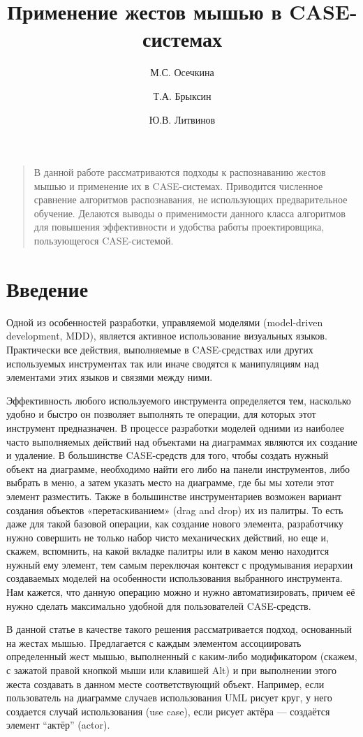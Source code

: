 \documentclass[a5paper]{article}
\title{Применение жестов мышью в CASE-системах}
\author{М.С. Осечкина \and Т.А. Брыксин \and Ю.В. Литвинов}
\date{}
\begin{document}
\maketitle
\thispagestyle{empty}

\begin{quote}
\small\noindent
В данной работе рассматриваются подходы к распознаванию жестов мышью и применение их в CASE-системах. Приводится численное сравнение алгоритмов распознавания, не использующих предварительное обучение. Делаются выводы о применимости данного класса алгоритмов для повышения эффективности и удобства работы проектировщика, пользующегося CASE-системой.
\end{quote}

\section*{Введение}
Одной из особенностей разработки, управляемой моделями (model-driven development, MDD), является активное использование визуальных языков. Практически все действия, выполняемые в CASE-средствах или других используемых инструментах так или иначе сводятся к манипуляциям над элементами этих языков и связями между ними. 

Эффективность любого используемого инструмента определяется тем, насколько удобно и быстро он позволяет выполнять те операции, для которых этот инструмент предназначен. В процессе разработки моделей одними из наиболее часто выполняемых действий над объектами на диаграммах являются их создание и удаление.  В большинстве CASE-средств для того, чтобы создать нужный объект на диаграмме, необходимо найти его либо на панели инструментов, либо выбрать в меню, а затем указать место на диаграмме, где бы мы хотели этот элемент разместить. Также в большинстве инструментариев возможен вариант создания объектов «перетаскиванием» (drag and drop) их из палитры. То есть даже для такой базовой операции, как создание нового элемента, разработчику нужно совершить не только набор чисто механических действий, но еще и, скажем, вспомнить, на какой вкладке палитры или в каком меню находится нужный ему элемент, тем самым переключая контекст с продумывания иерархии создаваемых моделей на особенности использования выбранного инструмента. Нам кажется, что данную операцию можно и нужно автоматизировать, причем её нужно сделать максимально удобной для пользователей CASE-средств. 

В данной статье в качестве такого решения рассматривается подход, основанный на жестах мышью. Предлагается с каждым элементом ассоциировать определенный жест мышью, выполненный с каким-либо модификатором (скажем, с зажатой правой кнопкой мыши или клавишей Alt) и при выполнении этого жеста создавать в данном месте соответствующий объект. Например, если пользователь на диаграмме случаев использования UML рисует круг, у него создается случай использования (use case), если рисует актёра --- создаётся элемент ``актёр'' (actor).
\end{document}
